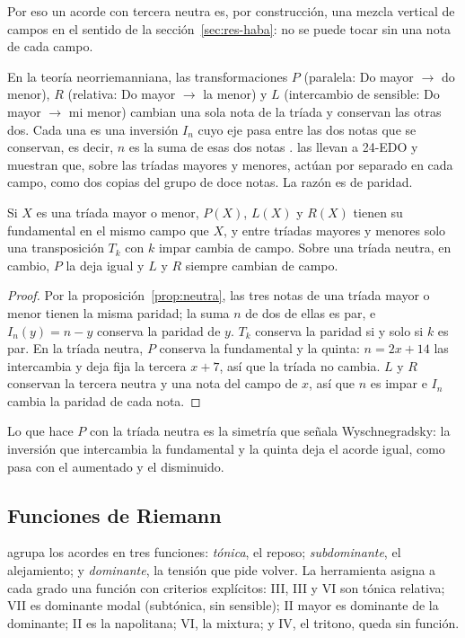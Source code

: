 Por eso un acorde con tercera neutra es, por construcción, una mezcla vertical de campos en el sentido de la
sección~\ref{sec:res-haba}: no se puede tocar sin una nota de cada campo.

En la teoría neorriemanniana, las transformaciones $P$ (paralela: Do mayor $\to$ do menor), $R$ (relativa: Do mayor $\to$
la menor) y $L$ (intercambio de sensible: Do mayor $\to$ mi menor) cambian una sola nota de la tríada y conservan las
otras dos. Cada una es una inversión $I_n$ cuyo eje pasa entre las dos notas que se conservan, es decir, $n$ es la suma de
esas dos notas \citep{crans2009}. \citet{flynn2025} las llevan a 24-EDO y muestran que, sobre las tríadas mayores y
menores, actúan por separado en cada campo, como dos copias del grupo de doce notas. La razón es de paridad.

\begin{proposicion}\label{prop:plr}
Si $X$ es una tríada mayor o menor, $P(X)$, $L(X)$ y $R(X)$ tienen su fundamental en el mismo campo que $X$, y entre
tríadas mayores y menores solo una transposición $T_k$ con $k$ impar cambia de campo. Sobre una tríada neutra, en
cambio, $P$ la deja igual y $L$ y $R$ siempre cambian de campo.
\end{proposicion}

\begin{proof}
Por la proposición~\ref{prop:neutra}, las tres notas de una tríada mayor o menor tienen la misma paridad; la suma $n$ de
dos de ellas es par, e $I_n(y) = n - y$ conserva la paridad de $y$. $T_k$ conserva la paridad si y solo si $k$ es par. En
la tríada neutra, $P$ conserva la fundamental y la quinta: $n = 2x + 14$ las intercambia y deja fija la tercera $x + 7$,
así que la tríada no cambia. $L$ y $R$ conservan la tercera neutra y una nota del campo de $x$, así que $n$ es impar e
$I_n$ cambia la paridad de cada nota.
\end{proof}

Lo que hace $P$ con la tríada neutra es la simetría que señala Wyschnegradsky: la inversión que intercambia la fundamental
y la quinta deja el acorde igual, como pasa con el aumentado y el disminuido.

\subsection{Funciones de Riemann}

\citet{riemann1893} agrupa los acordes en tres funciones: \emph{tónica}, el reposo; \emph{subdominante}, el
alejamiento; y \emph{dominante}, la tensión que pide volver. La herramienta asigna a cada grado una función con criterios
explícitos: \fl III, III y VI son tónica relativa; \fl VII es dominante modal (subtónica, sin sensible); II mayor es
dominante de la dominante; \fl II es la napolitana; \fl VI, la mixtura; y \sh IV, el tritono, queda sin función.

